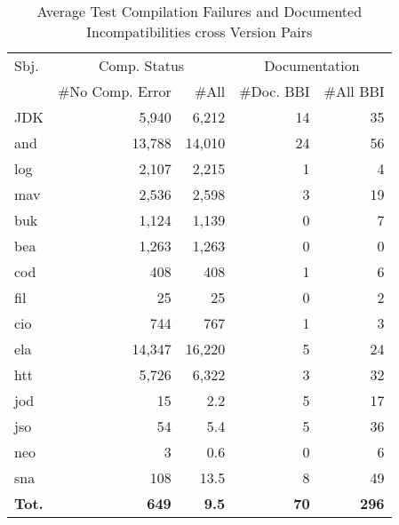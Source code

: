 \begin{table}
	\center 
	\caption{\label{table:test-doc} Average Test Compilation Failures and Documented Incompatibilities cross Version Pairs}
	\begin{tabular}{|p{0.5cm}|r|r||r|r|}
		\hline 
		Sbj. & \multicolumn{2}{c||}{Comp. Status} & \multicolumn{2}{c|}{Documentation}  \\ 		
		\cline{2-5}
		        & \#No Comp. Error & \#All & \#Doc. BBI & \#All BBI \\
        \hline
		JDK & 5,940 & 6,212 & 14 & 35  \\
		and & 13,788 & 14,010 & 24 &  56 \\ %
		log  & 2,107 & 2,215 & 1  & 4   \\			
		mav  & 2,536 & 2,598 & 3 & 19 \\		
		buk    & 1,124 & 1,139  & 0& 7 \\		
		bea &  1,263 & 1,263 & 0 & 0  \\
		cod    & 408 & 408 &  1  & 6  \\
		fil & 25 & 25 & 0 & 2 \\
		cio   &  744  & 767 & 1 & 3 \\
		ela  & 14,347  & 16,220 & 5 & 24 \\
		htt & 5,726 & 6,322 & 3 & 32 \\		
		jod & 15  & 2.2 & 5 & 17 \\
		jso  & 54 & 5.4 & 5 & 36  \\
		neo   & 3 &  0.6  & 0 & 6 \\
		sna & 108 &13.5 & 8 & 49  \\
		\hline
		\textbf{Tot.} & \textbf{649} & \textbf{9.5} & \textbf{70} & \textbf{296}\\
		\hline
	\end{tabular}
	\vspace{1cm}
\end{table}
